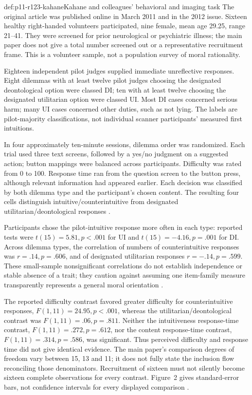 \begin{hbdefinition}{def:p11-r123-kahane}{Kahane and colleagues' behavioral and imaging task}
The original article was published online in March 2011 and in the 2012
issue. Sixteen healthy right-handed volunteers participated, nine female,
mean age 29.25, range 21--41. They were screened for prior neurological
or psychiatric illness; the main paper does not give a total number
screened out or a representative recruitment frame. This is a volunteer
sample, not a population survey of moral rationality.

Eighteen independent pilot judges supplied immediate unreflective responses.
Eight dilemmas with at least twelve pilot judges choosing the designated
deontological option were classed DI; ten with at least twelve choosing
the designated utilitarian option were classed UI. Most DI cases concerned
serious harm; many UI cases concerned other duties, such as not lying.
The labels are pilot-majority classifications, not individual scanner
participants' measured first intuitions.

In four approximately ten-minute sessions, dilemma order was randomized.
Each trial used three text screens, followed by a yes/no judgment on a
suggested action; button mappings were balanced across participants.
Difficulty was rated from 0 to 100. Response time ran from the question
screen to the button press, although relevant information had appeared
earlier. Each decision was classified by both dilemma type and the
participant's chosen content. The resulting four cells distinguish
intuitive/counterintuitive from designated utilitarian/deontological
responses \parencite[pp.~394--395]{KahaneEtAl2012IntuitivenessR123}.
\end{hbdefinition}

Participants chose the pilot-intuitive response more often in each type:
reported tests were \(t(15)=5.81,p<.001\) for UI and
\(t(15)=-4.16,p=.001\) for DI. Across dilemma types, the correlation
of numbers of counterintuitive responses was \(r=.14,p=.606\), and
of designated utilitarian responses \(r=-.14,p=.599\).
These small-sample nonsignificant correlations do not establish independence
or stable absence of a trait; they caution against assuming one item-family
measure transparently represents a general moral orientation
\parencite[p.~396]{KahaneEtAl2012IntuitivenessR123}.

The reported difficulty contrast favored greater difficulty for
counterintuitive responses, \(F(1,11)=24.95,p<.001\), whereas the
utilitarian/deontological contrast was \(F(1,11)=.06,p=.811\).
Neither the intuitiveness response-time contrast,
\(F(1,11)=.272,p=.612\), nor the content response-time contrast,
\(F(1,11)=.314,p=.586\), was significant. Thus perceived difficulty
and response time did not give identical evidence. The main paper's
comparison degrees of freedom vary between 15, 13 and 11; it does not
fully state the inclusion flow reconciling those denominators. Recruitment
of sixteen must not silently become sixteen complete observations for
every contrast. Figure~2 gives standard-error bars, not confidence
intervals for every displayed comparison
\parencite[pp.~396--397]{KahaneEtAl2012IntuitivenessR123}.

